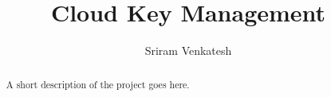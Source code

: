 \documentclass[11pt
              , a4paper
              , twoside
              , openright
              ]{report}
\title{Cloud Key Management}
\author{Sriram Venkatesh}
\date{}
\begin{document}
\frontmatter



\begin{abstract}

A short description of the project goes here.

\end{abstract}


\maketitle



\tableofcontents



\mainmatter












\backmatter





\end{document}
